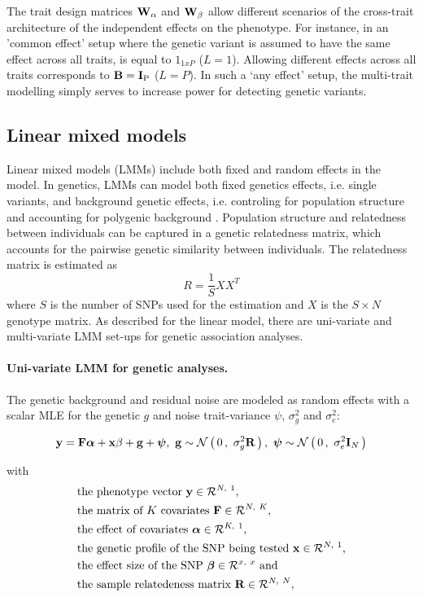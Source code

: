 The trait design matrices \(\boldsymbol{\mathbf{W}}_{\alpha}\) and \(\boldsymbol{\mathbf{W}}_{\beta}\) allow different scenarios of the cross-trait architecture of the independent effects on the phenotype.  For instance, in an 'common effect' setup where the genetic variant is assumed to have the same effect across all traits,   is equal to \(1_{1xP}\) (\(L=1\)). Allowing different effects across all traits corresponds to  \( \boldsymbol{\mathbf{B}} =  \boldsymbol{\mathbf{I}}_\text{P} \) (\(L=P\)). In such a `any effect' setup, the multi-trait modelling simply serves to increase power for detecting genetic variants. 

\subsection{Linear mixed models}
Linear mixed models (LMMs) include both fixed and random effects in the model. In genetics, LMMs can model both fixed genetics effects, i.e. single variants, and background genetic effects, i.e. controling for population structure and accounting for polygenic background \citep{Yu2006}. Population structure and relatedness between individuals can be captured in a genetic relatedness matrix, which accounts for the pairwise genetic similarity between individuals. The relatedness matrix is estimated as
 \begin{equation}
 R = \frac{1}{S}XX^T
 \label{eq:relatedness}
 \end{equation}
 where \(S\) is the number of SNPs used for the estimation and \(X\) is the \(S \times N\) genotype matrix. As described for the linear model, there are uni-variate and multi-variate LMM set-ups for genetic association analyses. 


\paragraph{Uni-variate LMM for genetic analyses.} The genetic background and residual noise are modeled as random effects with a scalar MLE for the genetic \(g\) and noise trait-variance \(\psi\),   \(\sigma_g^2\) and \(\sigma_e^2\):

\begin{equation}
\boldsymbol{\mathbf{y}} =\boldsymbol{\mathbf{F}}\boldsymbol{\mathbf{\alpha}} +\boldsymbol{\mathbf{x}}\beta +\boldsymbol{\mathbf{g}}+\boldsymbol{\mathbf{\psi}},\text{ }
\boldsymbol{\mathbf{g}} \sim \mathcal{N}\left(\,{0}\,,~{\sigma_g^2\boldsymbol{\mathbf{R}}}\,\right),\text{ }
\boldsymbol{\mathbf{\psi}} \sim\mathcal{N}\left(\,{0}\,,~{\sigma_e^2\boldsymbol{\mathbf{I}}_N}\,\right)
\label{eq:lmm-uv}
\end{equation}

with
\begin{align*} 
& \text{the phenotype vector }\boldsymbol{\mathbf{y}} \in \mathcal{R}^{N,~1},\\
& \text{the matrix of $K$ covariates }\boldsymbol{\mathbf{F}} \in \mathcal{R}^{N,~K},\\
& \text{the effect of covariates } \boldsymbol{\mathbf{\alpha}} \in \mathcal{R}^{K,~1},\\
& \text{the genetic profile of the SNP being tested }\boldsymbol{\mathbf{x}} \in \mathcal{R}^{N,~1},\\
& \text{the effect size of the SNP } \boldsymbol{\mathbf{\beta}} \in \mathcal{R}^{x,~x} \text{ and}\\
& \text{the sample relatedeness matrix }\boldsymbol{\mathbf{R}} \in \mathcal{R}^{N,~N},
\end{align*} 

